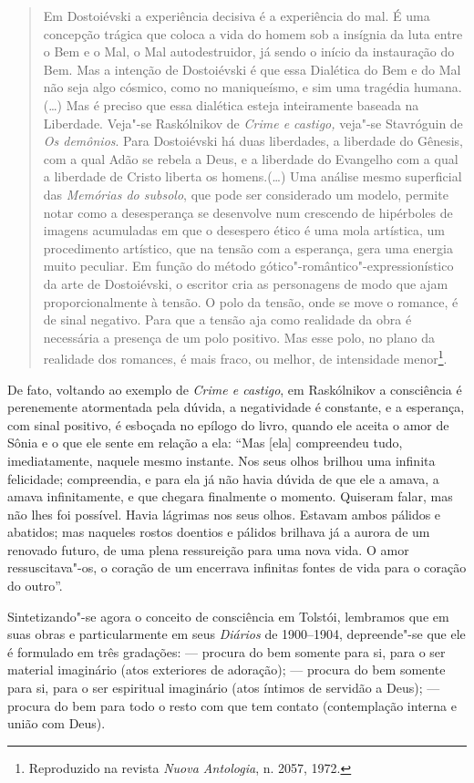 {{\begin{quote}
Em Dostoiévski a experiência decisiva é a experiência do mal. É uma
concepção trágica que coloca a vida do homem sob a insígnia da luta
entre o Bem e o Mal, o Mal autodestruidor, já sendo o início da
instauração do Bem. Mas a intenção de Dostoiévski é que essa Dialética
do Bem e do Mal não seja algo cósmico, como no maniqueísmo, e sim uma
tragédia humana. (\ldots{}) Mas é preciso que essa
dialética esteja inteiramente baseada na Liberdade. Veja"-se Raskólnikov
de \emph{Crime e castigo,} veja"-se Stavróguin de \emph{Os
demônios}. Para Dostoiévski há duas liberdades, a liberdade do Gênesis,
com a qual Adão se rebela a Deus, e a liberdade do Evangelho com a qual a
liberdade de Cristo liberta os homens.(\ldots{}) Uma análise mesmo
superficial das \emph{Memórias do subsolo}, que pode ser considerado um
modelo, permite notar como a desesperança se desenvolve num crescendo de
hipérboles de imagens acumuladas em que o desespero ético é uma mola
artística, um procedimento artístico, que na tensão com a esperança,
gera uma energia muito peculiar. Em função do método
gótico"-romântico"-expressionístico da arte de Dostoiévski, o escritor
cria as personagens de modo que ajam proporcionalmente à tensão. O polo
da tensão, onde se move o romance, é de sinal negativo. Para que a
tensão aja como realidade da obra é necessária a presença de um polo
positivo. Mas esse polo, no plano da realidade dos romances, é mais
fraco, ou melhor, de intensidade menor\footnote{Reproduzido na
revista \emph{Nuova Antologia}, n. 2057, 1972.}.
\end{quote}

De fato, voltando ao exemplo de \emph{Crime e castigo}, em Raskólnikov a
consciência é perenemente atormentada pela dúvida, a negatividade é
constante, e a esperança, com sinal positivo, é esboçada no epílogo do
livro, quando ele aceita o amor de Sônia e o que ele sente em relação a
ela: ``Mas [ela] compreendeu tudo, imediatamente, naquele mesmo
instante. Nos seus olhos brilhou uma infinita felicidade; compreendia, e
para ela já não havia dúvida de que ele a amava, a amava infinitamente,
e que chegara finalmente o momento. Quiseram falar, mas não lhes foi possível. Havia lágrimas nos seus
olhos. Estavam ambos pálidos e abatidos; mas naqueles rostos doentios e
pálidos brilhava já a aurora de um renovado futuro, de uma plena
ressureição para uma nova vida. O amor ressuscitava"-os, o coração de um
encerrava infinitas fontes de vida para o coração do outro''.

Sintetizando"-se agora o conceito de consciência em Tolstói, lembramos que em suas
obras e particularmente em seus \emph{Diários} de 1900--1904,
depreende"-se que ele é formulado em três gradações:  --- procura do bem
somente para si, para o ser material imaginário (atos exteriores de
adoração);  --- procura do bem somente para si, para o ser espiritual
imaginário (atos íntimos de servidão a Deus);  --- procura do bem
para todo o resto com que tem contato (contemplação interna e união com Deus).

}}
